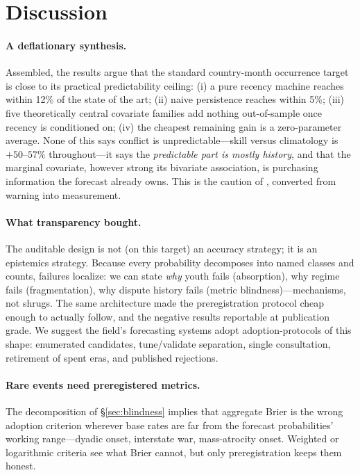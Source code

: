 \documentclass[11pt]{article}
\begin{document}
\section{Discussion}\label{sec:discussion}

\paragraph{A deflationary synthesis.} Assembled, the results argue that the
standard country-month occurrence target is close to its practical
predictability ceiling: (i) a pure recency machine reaches within 12\% of
the state of the art; (ii) naive persistence reaches within 5\%; (iii) five
theoretically central covariate families add nothing out-of-sample once
recency is conditioned on; (iv) the cheapest remaining gain is a
zero-parameter average. None of this says conflict is
unpredictable---skill versus climatology is $+50$--$57\%$ throughout---it
says the \emph{predictable part is mostly history}, and that the marginal
covariate, however strong its bivariate association, is purchasing
information the forecast already owns. This is the caution of
\citet{cederman2017predicting}, converted from warning into measurement.

\paragraph{What transparency bought.} The auditable design is not (on this
target) an accuracy strategy; it is an epistemics strategy. Because every
probability decomposes into named classes and counts, failures localize: we
can state \emph{why} youth fails (absorption), why regime fails
(fragmentation), why dispute history fails (metric blindness)---mechanisms,
not shrugs. The same architecture made the preregistration protocol cheap
enough to actually follow, and the negative results reportable at
publication grade. We suggest the field's forecasting systems adopt
adoption-protocols of this shape: enumerated candidates, tune/validate
separation, single consultation, retirement of spent eras, and published
rejections.

\paragraph{Rare events need preregistered metrics.} The decomposition of
\S\ref{sec:blindness} implies that aggregate Brier is the wrong adoption
criterion wherever base rates are far from the forecast probabilities'
working range---dyadic onset, interstate war, mass-atrocity onset. Weighted
or logarithmic criteria see what Brier cannot, but only preregistration
keeps them honest.
\end{document}
